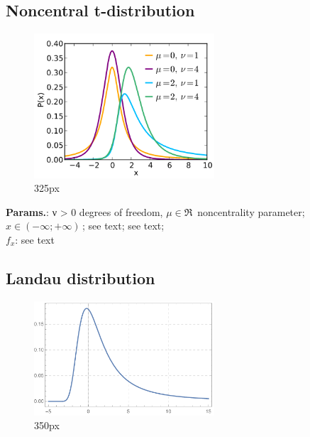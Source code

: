     
        
\subsection{Noncentral t-distribution}


    \begin{figure}[H]
        \centering
        \includegraphics[width=0.6\textwidth]{images/nc student t pdf.png}
        \caption{325px}
    \end{figure}




    {\color{darkblue} \textbf{Params.}:} {ν > 0 degrees of freedom,  $\mu \in \Re \,\!$ noncentrality parameter}; {$x \in (-\infty; +\infty)\,\!$}; {see text}; {see text};\hspace{0.5cm}\\{\color{darkblue} \textbf{$f_x$}:} {see text}



    
        
\subsection{Landau distribution}


    \begin{figure}[H]
        \centering
        \includegraphics[width=0.6\textwidth]{images/Landau Distribution PDF.png}
        \caption{350px}
    \end{figure}




